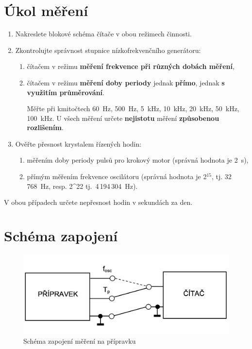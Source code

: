 \documentclass[a4paper,12pt]{article}   %
\newcommand{\texp}[1]{$^\textrm{#1}$}
\begin{document}
\section{Úkol měření}
\label{chap:zadani}
\begin{enumerate}
    \item Nakreslete blokové schéma čítače v obou režimech činnosti.
    \item Zkontrolujte správnost stupnice nízkofrekvenčního generátoru:
    \begin{enumerate}[label=\alph*)]
        \item čítačem v režimu \textbf{měření frekvence při různých dobách měření},
        \item čítačem v režimu \textbf{měření doby periody} jednak \textbf{přímo}, jednak \textbf{s využitím průměrování}.

        Měřte při kmitočtech 60~Hz, 500~Hz, 5~kHz, 10~kHz, 20~kHz, 50~kHz, 100~kHz. U všech měření určete \textbf{nejistotu} měření \textbf{způsobenou rozlišením}.
    \end{enumerate}
    \item Ověřte přesnost krystalem řízených hodin:
    \begin{enumerate}[label=\alph*)]
        \item měřením doby periody pulsů pro krokový motor (správná hodnota je 2~s),
        \item přímým měřením frekvence oscilátoru (správná hodnota je 2\texp{15}, tj. 32\,768~Hz, resp. 2^{22} tj.~4\,194\,304~Hz).
    \end{enumerate}
\end{enumerate}
V obou případech určete nepřesnost hodin v sekundách za den.



\section{Schéma zapojení}
\label{schema_zapojeni}
\begin{figure}[h!]
  \centering
  \includegraphics[width=.6\textwidth]{schema.png}
  \caption{Schéma zapojení měření na přípravku}
  \label{fig:schema}
\end{figure}
\end{document}
